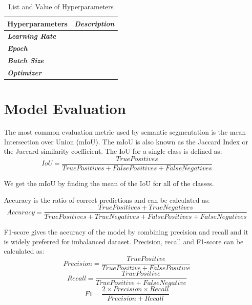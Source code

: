 \begin{table}[!h]
\centering
\begin{tabular}{|l|l|}
\hline
\multicolumn{1}{|c|}{\textbf{Hyperparameters}} & \multicolumn{1}{c|}{\textit{\textbf{Description}}} \\ \hline
\textit{\textbf{Learning Rate}}                &                                                    \\ \hline
\textit{\textbf{Epoch}}                        &                                                    \\ \hline
\textit{\textbf{Batch Size}}                   &                                                    \\ \hline
\textit{\textbf{Optimizer}}                    &                                                    \\ \hline
\end{tabular}
\caption{List and Value of Hyperparameters}
\label{tab:hyperparam-value}

\end{table}

\section{Model Evaluation}

The most common evaluation metric used by semantic segmentation is the mean Intersection over Union (mIoU). The mIoU is also known as the Jaccard Index or the Jaccard similarity coefficient. The IoU for a single class is defined as:
\begin{equation}
    IoU = \frac{True Positives}{True Positives + False Positives + False Negatives}
\end{equation}

We get the mIoU by finding the mean of the IoU for all of the classes.

Accuracy is the ratio of correct predictions and can be calculated as:
\begin{equation}
     Accuracy = \frac{True Positives + True Negatives}{True Positives + True Negatives + False Positives + False Negatives}
 \end{equation}

 F1-score gives the accuracy of the model by combining precision and recall and it is widely preferred for imbalanced dataset. Precision, recall and F1-score can be calculated as:
 \begin{equation}
     Precision = \frac{True Positive}{True Positive + False Positive}
 \end{equation}
 \begin{equation}
     Recall = \frac{True Positive}{True Positive + False Negative}
 \end{equation}
\begin{equation}
     F1 = \frac{2 \times Precision \times Recall}{Precision + Recall}
 \end{equation}

